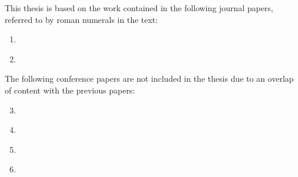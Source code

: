 \begin{refsection}

This thesis is based on the work contained in the following journal papers,
referred to by roman numerals in the text:
\begin{enumerate}[I]
 \item \label{paper:turbulence}  %
 \item \label{paper:overview}  %
\end{enumerate}
The following conference papers are not included in the thesis due to an overlap
of content with the previous papers:
\begin{enumerate}[I]
 \setcounter{enumi}{2}
 \item \label{paper:forum2014}  %
 \item \label{paper:asa2014}  %
 \item \label{paper:euronoise2015}  %
 \item \label{paper:internoise2016}  %
\end{enumerate}

\end{refsection}
